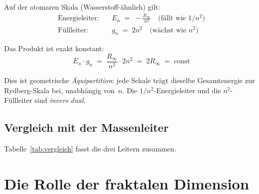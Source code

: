 Auf der atomaren Skala (Wasserstoff-ähnlich) gilt:
\begin{align}
  \text{Energieleiter:} &\quad E_n \;=\; -\frac{R_\infty}{n^2}
    \quad\text{(fällt wie } 1/n^2\text{)} \\
  \text{Füllleiter:}    &\quad g_n \;=\; 2n^2
    \quad\text{(wächst wie } n^2\text{)}
\end{align}

Das Produkt ist exakt konstant:
\begin{equation}
  \boxed{E_n \cdot g_n \;=\; \frac{R_\infty}{n^2} \cdot 2n^2 \;=\; 2R_\infty
  \;=\; \text{const}}
  \label{eq:dualitaet}
\end{equation}

Dies ist geometrische \emph{Äquipartition}: jede Schale trägt dieselbe
Gesamtenergie zur Rydberg-Skala bei, unabhängig von~$n$.
Die $1/n^2$-Energieleiter und die $n^2$-Füllleiter sind \emph{invers dual}.

\subsection{Vergleich mit der Massenleiter}

Tabelle~\ref{tab:vergleich} fasst die drei Leitern zusammen.

\begin{table}[htbp]
\centering
\caption{Drei Leitern — ein geometrischer Ursprung}
\label{tab:vergleich}
\end{table}

\section{Die Rolle der fraktalen Dimension}
\label{sec:fraktal}

